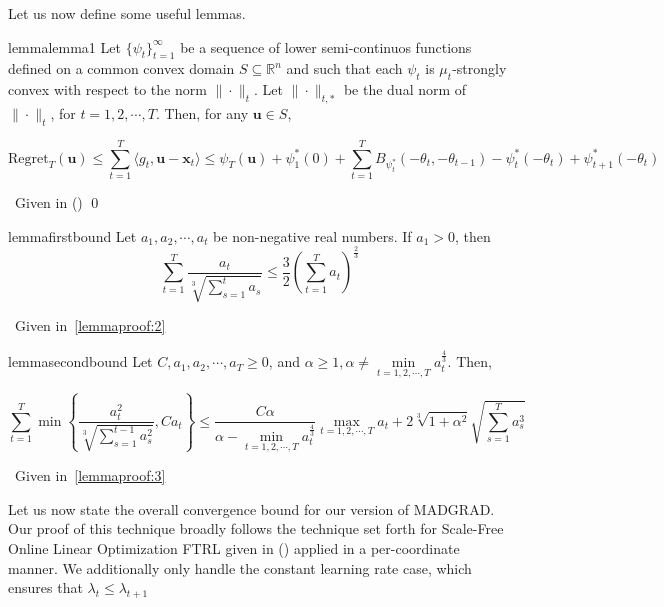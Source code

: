 \documentclass{article}
\newcommand{\R}{\mathbb{R}}
\newcommand{\Regret}{\text{Regret}}
\newcommand{\bx}{\mathbf{x}}
\newcommand{\bu}{\mathbf{u}}
\begin{document}
Let us now define some useful lemmas.

\begin{restatable}{lemma}{lemma1}\label{lemma:1}
  Let $\{\psi_t\}_{t=1}^\infty$ be a sequence of lower semi-continuos functions defined on a common convex domain $S
  \subseteq \R^n$ and such that each $\psi_t$ is $\mu_t$-strongly convex with respect to the norm $\|\cdot\|_t$. Let
  $\|\cdot\|_{t, *}$ be the dual norm of $\| \cdot \|_t$, for $t = 1, 2, \cdots, T$. Then, for any $\bu \in S$,

  \[
    \Regret _T (\bu) \leq \sum\limits_{t=1}^T \langle g_t, \bu - \bx_t \rangle \leq \psi_{T}(\bu) + \psi_{1}^* (0) +
    \sum\limits_{t=1}^T B_{\psi_{t}^*}(-\theta_t, -\theta_{t-1}) - \psi_{t}^* (-\theta_t) +
    \psi_{t+1}^*(-\theta_t)
  \]
\end{restatable}

\proof~Given in (\cite{orabona_generalized_2014})
\qed

\begin{restatable}{lemma}{firstbound}\label{lemma:2}
  Let $a_1, a_2, \cdots, a_t$ be non-negative real numbers. If $a_1 > 0$, then
  \[
    \sum\limits_{t=1}^T \frac{a_t}{\sqrt[3]{\sum\limits_{s=1}^t a_s}} \leq \frac{3}{2}\left(\sum\limits_{t=1}^T
    a_t\right)^\frac{2}{3}
  \]
\end{restatable}

\proof~Given in~\ref{lemmaproof:2}

\begin{restatable}{lemma}{secondbound}\label{lemma:3}
  Let $C, a_1, a_2, \cdots, a_T \geq 0$, and $\alpha \geq 1, \alpha \neq \min\limits_{t=1,2,\cdots,T}a_{t}^\frac{4}{3}$.
  Then,

  \[
    \sum\limits_{t=1}^T \min \left\{ \frac{a_{t}^2}{\sqrt[3]{\sum\limits_{s=1}^{t-1} a_{s}^2}}, C a_t\right\} \leq
    \frac{C \alpha}{\alpha - \min\limits_{t=1,2,\cdots,T}a_{t}^\frac{4}{3}} \max\limits_{t=1,2,\cdots,T} a_t
    + 2\sqrt[3]{1 + \alpha^2} \sqrt{\sum\limits_{s=1}^T a_{s}^3}
  \]
\end{restatable}

\proof~Given in~\ref{lemmaproof:3}

Let us now state the overall convergence bound for our version of MADGRAD. Our proof of this technique broadly follows
the technique set forth for Scale-Free Online Linear Optimization FTRL given in (\cite{orabona_scale-free_2015}) applied
in a per-coordinate manner. We additionally only handle the constant learning rate case, which ensures that $\lambda_t
\leq \lambda_{t+1}$
\end{document}
